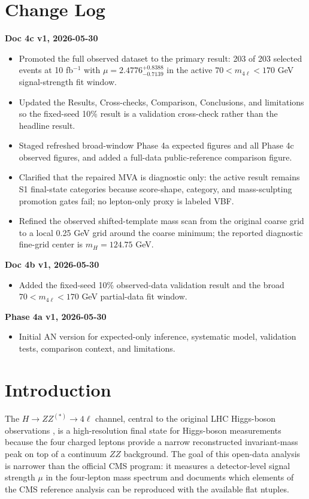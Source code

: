 \documentclass[11pt]{article}
\begin{document}
\section*{Change Log}
\textbf{Doc 4c v1, 2026-05-30}
\begin{itemize}[leftmargin=*]
\item Promoted the full observed dataset to the primary result: 203 of 203 selected events at 10 fb$^{-1}$ with $\mu=2.4776^{+0.8388}_{-0.7139}$ in the active $70 < m_{4\ell} < 170$ GeV signal-strength fit window.
\item Updated the Results, Cross-checks, Comparison, Conclusions, and limitations so the fixed-seed 10\% result is a validation cross-check rather than the headline result.
\item Staged refreshed broad-window Phase 4a expected figures and all Phase 4c observed figures, and added a full-data public-reference comparison figure.
\item Clarified that the repaired MVA is diagnostic only: the active result remains S1 final-state categories because score-shape, category, and mass-sculpting promotion gates fail; no lepton-only proxy is labeled VBF.
\item Refined the observed shifted-template mass scan from the original coarse grid to a local 0.25 GeV grid around the coarse minimum; the reported diagnostic fine-grid center is $m_H=124.75$ GeV.
\end{itemize}
\textbf{Doc 4b v1, 2026-05-30}
\begin{itemize}[leftmargin=*]
\item Added the fixed-seed 10\% observed-data validation result and the broad $70 < m_{4\ell} < 170$ GeV partial-data fit window.
\end{itemize}
\textbf{Phase 4a v1, 2026-05-30}
\begin{itemize}[leftmargin=*]
\item Initial AN version for expected-only inference, systematic model, validation tests, comparison context, and limitations.
\end{itemize}
\clearpage
\section{Introduction}
The $H\to ZZ^{(*)}\to4\ell$ channel, central to the original LHC Higgs-boson observations \cite{CMSDiscovery2012,ATLASDiscovery2012}, is a high-resolution final state for Higgs-boson measurements because the four charged leptons provide a narrow reconstructed invariant-mass peak on top of a continuum $ZZ$ background. The goal of this open-data analysis is narrower than the official CMS program: it measures a detector-level signal strength $\mu$ in the four-lepton mass spectrum and documents which elements of the CMS reference analysis can be reproduced with the available flat ntuples.
\end{document}
